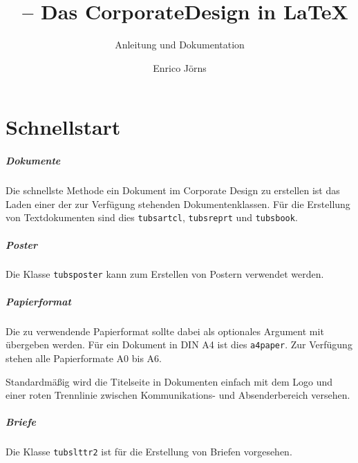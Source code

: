 \documentclass[a4paper,11pt]{tubsreprt}
\title{\tubslatex\ -- Das CorporateDesign in \LaTeX}
\subtitle{Anleitung und Dokumentation}
\author{Enrico Jörns}
\begin{document}
\maketitle



\pagestyle{scrheadings}
\tableofcontents


\newcommand{\newdocumentclass}[1]{\textcolor{tuRed}{\lstinline{#1}}}
\newcommand{\newpackage}[1]{\textcolor{tuRed}{\lstinline{#1}}}



\chapter{Schnellstart}\label{chap:rapid}

\paragraph{Dokumente}
Die schnellste Methode ein Dokument im Corporate Design zu erstellen ist
das Laden einer der zur Verfügung stehenden Dokumentenklassen.
Für die Erstellung von Textdokumenten sind dies \newdocumentclass{tubsartcl},
\newdocumentclass{tubsreprt} und \newdocumentclass{tubsbook}.

\paragraph{Poster}
Die Klasse \newdocumentclass{tubsposter} kann zum Erstellen von Postern verwendet werden.

\paragraph{Papierformat}
Die zu verwendende Papierformat sollte dabei als optionales Argument mit
übergeben werden. Für ein Dokument in DIN A4 ist dies \texttt{a4paper}.
Zur Verfügung stehen alle Papierformate A0 bis A6.

Standardmäßig wird die Titelseite in Dokumenten einfach mit dem Logo und einer
roten Trennlinie zwischen Kommunikations- und Absenderbereich versehen.

\paragraph{Briefe}

Die Klasse \newdocumentclass{tubslttr2} ist für die Erstellung von Briefen
vorgesehen.
\end{document}
